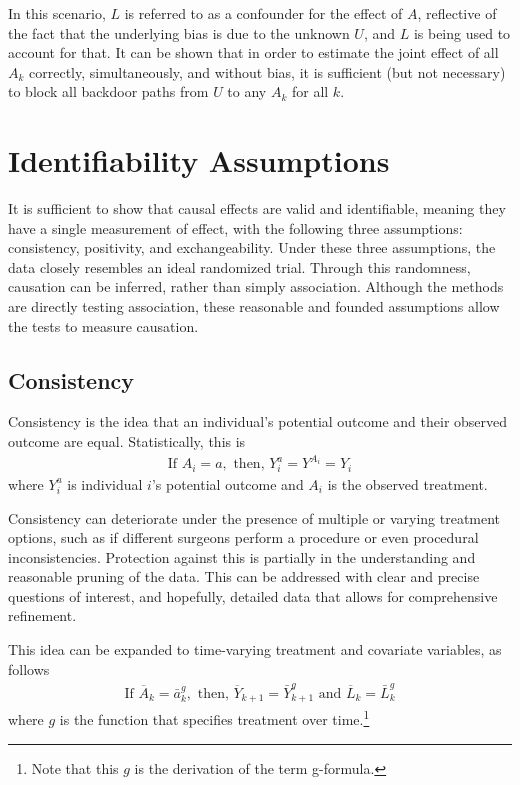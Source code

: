 In this scenario, $L$ is referred to as a confounder for the effect of $A$, reflective of the fact that the underlying bias is due to the unknown $U$, and $L$ is being used to account for that.  It can be shown that in order to estimate the joint effect of all $A_k$ correctly, simultaneously, and without bias, it is sufficient (but not necessary) to block all backdoor paths from $U$ to any $A_k$ for all $k$.\cite{pearl1995probabilistic}

\section{Identifiability Assumptions} \label{assumptions} 
It is sufficient to show that causal effects are valid and identifiable, meaning they have a single measurement of effect, with the following three assumptions: consistency, positivity, and exchangeability.\cite{cole2009consistency, hernan_robins_2016}   Under these three assumptions, the data closely resembles an ideal randomized trial.  Through this randomness, causation can be inferred, rather than simply association.  Although the methods are directly testing association, these reasonable and founded assumptions allow the tests to measure causation.  
 
\subsection{Consistency} 
Consistency is the idea that an individual's potential outcome and their observed outcome are equal\cite{cole2009consistency, hernan_robins_2016}.  Statistically, this is 
\begin{align} 
\text{If  } A_i = a, \text{     then,    } Y_i^a = Y^{A_i} = Y_i 
\end{align} 
where $Y_i^a$ is individual $i$'s potential outcome and $A_i$ is the observed treatment.  

Consistency can deteriorate under the presence of multiple or varying treatment options, such as if different surgeons perform a procedure or even procedural inconsistencies.  Protection against this is partially in the understanding and reasonable pruning of the data.  This can be addressed with clear and precise questions of interest, and hopefully, detailed data that allows for comprehensive refinement.  

This idea can be expanded to time-varying treatment and covariate variables, as follows 
\begin{align} 
\text{If } \overline{A}_k = \bar{a}^g _k, \text{ then, } \overline{Y}_{k+1} =  \bar{Y}^g_{k+1} \text{ and } \overline{L}_k = \bar{L}^g_k
\end{align}
where $g$ is the function that specifies treatment over time.\footnote{Note that this $g$ is the derivation of the term g-formula.}

